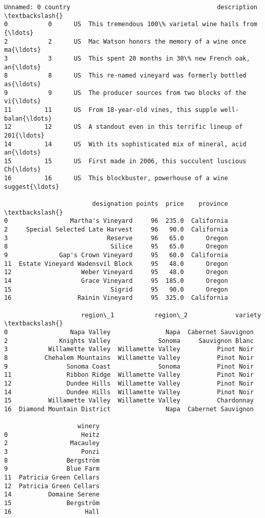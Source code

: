 \documentclass[11pt]{article}
\begin{document}
    \begin{Verbatim}[commandchars=\\\{\}]
   Unnamed: 0 country                                        description  \textbackslash{}
0           0      US  This tremendous 100\% varietal wine hails from {\ldots}
2           2      US  Mac Watson honors the memory of a wine once ma{\ldots}
3           3      US  This spent 20 months in 30\% new French oak, an{\ldots}
8           8      US  This re-named vineyard was formerly bottled as{\ldots}
9           9      US  The producer sources from two blocks of the vi{\ldots}
11         11      US  From 18-year-old vines, this supple well-balan{\ldots}
12         12      US  A standout even in this terrific lineup of 201{\ldots}
14         14      US  With its sophisticated mix of mineral, acid an{\ldots}
15         15      US  First made in 2006, this succulent luscious Ch{\ldots}
16         16      US  This blockbuster, powerhouse of a wine suggest{\ldots}

                        designation points  price    province  \textbackslash{}
0                 Martha's Vineyard     96  235.0  California
2     Special Selected Late Harvest     96   90.0  California
3                           Reserve     96   65.0      Oregon
8                            Silice     95   65.0      Oregon
9              Gap's Crown Vineyard     95   60.0  California
11  Estate Vineyard Wadensvil Block     95   48.0      Oregon
12                   Weber Vineyard     95   48.0      Oregon
14                   Grace Vineyard     95  185.0      Oregon
15                           Sigrid     95   90.0      Oregon
16                  Rainin Vineyard     95  325.0  California

                     region\_1           region\_2             variety  \textbackslash{}
0                 Napa Valley               Napa  Cabernet Sauvignon
2              Knights Valley             Sonoma     Sauvignon Blanc
3           Willamette Valley  Willamette Valley          Pinot Noir
8          Chehalem Mountains  Willamette Valley          Pinot Noir
9                Sonoma Coast             Sonoma          Pinot Noir
11               Ribbon Ridge  Willamette Valley          Pinot Noir
12               Dundee Hills  Willamette Valley          Pinot Noir
14               Dundee Hills  Willamette Valley          Pinot Noir
15          Willamette Valley  Willamette Valley          Chardonnay
16  Diamond Mountain District               Napa  Cabernet Sauvignon

                    winery
0                    Heitz
2                 Macauley
3                    Ponzi
8                Bergström
9                Blue Farm
11  Patricia Green Cellars
12  Patricia Green Cellars
14          Domaine Serene
15               Bergström
16                    Hall
    \end{Verbatim}
\end{document}
